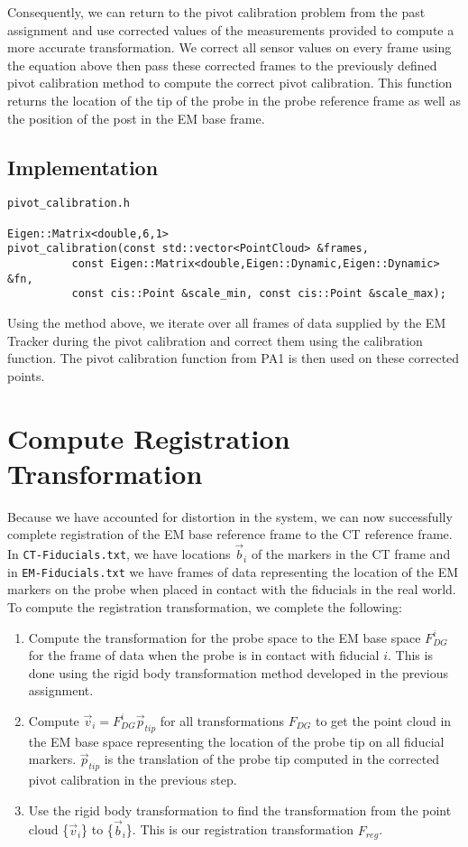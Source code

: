 \documentclass[letterpaper, 11pt]{report}
\begin{document}
Consequently, we can return to the pivot calibration problem from the past assignment and use corrected values of the measurements provided to compute a more accurate transformation. We correct all sensor values on every frame using the equation above then pass these corrected frames to the previously defined pivot calibration method to compute the correct pivot calibration. This function returns the location of the tip of the probe in the probe reference frame as well as the position of the post in the EM base frame.

\subsection*{Implementation}
\begin{verbatim}
pivot_calibration.h

Eigen::Matrix<double,6,1>
pivot_calibration(const std::vector<PointCloud> &frames,
          const Eigen::Matrix<double,Eigen::Dynamic,Eigen::Dynamic> &fn,
          const cis::Point &scale_min, const cis::Point &scale_max);
\end{verbatim}
Using the method above, we iterate over all frames of data supplied by the EM Tracker during the pivot calibration and correct them using the calibration function. The pivot calibration function from PA1 is then used on these corrected points.
\section{Compute Registration Transformation}
Because we have accounted for distortion in the system, we can now successfully complete registration of the EM base reference frame to the CT reference frame. In \texttt{CT-Fiducials.txt}, we have locations $\vec b_i$ of the markers in the CT frame and in \texttt{EM-Fiducials.txt} we have frames of data representing the location of the EM markers on the probe when placed in contact with the fiducials in the real world. To compute the registration transformation, we complete the following:

\begin{enumerate}
\item Compute the transformation for the probe space to the EM base space $F_{DG}^{i}$ for the frame of data when the probe is in contact with fiducial $i$. This is done using the rigid body transformation method developed in the previous assignment.
\item Compute $\vec v_i = F_{DG}^{i}\vec p_{tip}$ for all transformations $F_{DG}$ to get the point cloud in the EM base space representing the location of the probe tip on all fiducial markers. $\vec p_{tip}$ is the translation of the probe tip computed in the corrected pivot calibration in the previous step.
\item Use the rigid body transformation to find the transformation from the point cloud \{$\vec v_i$\} to \{$\vec b_i$\}. This is our registration transformation $F_{reg}$.
\end{enumerate}
\end{document}
